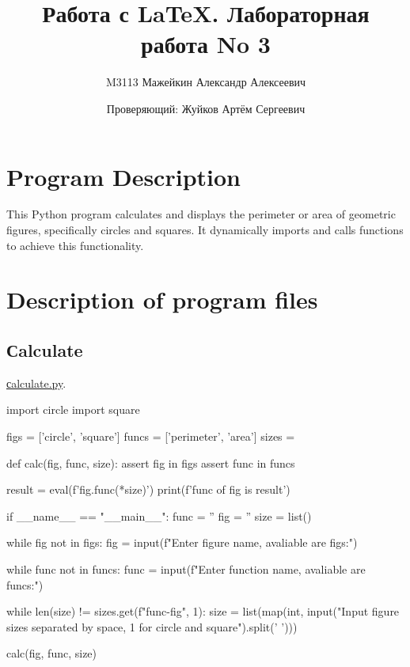 \documentclass[12pt]{article}
\author{M3113 Мажейкин Александр Алексеевич \and Проверяющий: Жуйков Артём Сергеевич}
\title{Работа с LaTeX. Лабораторная работа No 3}
\date{}
\begin{document}
    

\maketitle

\newpage
\tableofcontents

\newpage

\section{Program Description}
This Python program calculates and displays the perimeter or area of geometric figures, specifically circles and squares. It dynamically imports and calls functions to achieve this functionality.

\newpage

\section{Description of program files}

\subsection{Сalculate}
\href{https://github.com/niumandzi/geometric_lib/blob/docs/calculate.py}{сalculate.py}.


\begin{python}
import circle
import square


figs = ['circle', 'square']
funcs = ['perimeter', 'area']
sizes = {}

def calc(fig, func, size):
	assert fig in figs
	assert func in funcs

	result = eval(f'{fig}.{func}(*{size})')
	print(f'{func} of {fig} is {result}')

if __name__ == "__main__":
	func = ''
	fig = ''
	size = list()
    
	while fig not in figs:
		fig = input(f"Enter figure name, avaliable are {figs}:\n")
	
	while func not in funcs:
		func = input(f"Enter function name, avaliable are {funcs}:\n")
	
	while len(size) != sizes.get(f"{func}-{fig}", 1):
		size = list(map(int, input("Input figure sizes separated by space, 1 for circle and square\n").split(' ')))
	
	calc(fig, func, size)
\end{python}

\newpage
\end{document}
